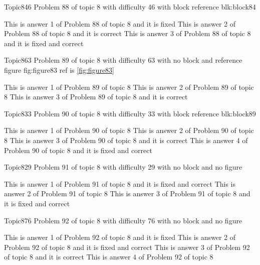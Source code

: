 \documentclass[master]{exam}
\begin{document}
\begin{problem}[requires=blk:block84]{Topic8}{46}
	Problem 88 of topic 8 with difficulty 46 with block reference blk:block84
	\begin{answers}
		\answer[fixed] This is answer 1 of Problem 88 of topic 8 and it is fixed
		\answer[correct] This is answer 2 of Problem 88 of topic 8 and it is correct
		 This is answer 3 of Problem 88 of topic 8 and it is fixed and correct
	\end{answers}
\end{problem}

\begin{problem}{Topic8}{63}
	Problem 89 of topic 8 with difficulty 63 with no block and reference figure fig:figure83 ref is \ref{fig:figure83}
	\begin{answers}
		\answer This is answer 1 of Problem 89 of topic 8 
		\answer This is answer 2 of Problem 89 of topic 8 
		\answer[correct] This is answer 3 of Problem 89 of topic 8 and it is correct
	\end{answers}
\end{problem}

\begin{problem}[requires=blk:block89]{Topic8}{33}
	Problem 90 of topic 8 with difficulty 33 with block reference blk:block89
	\begin{answers}
		\answer This is answer 1 of Problem 90 of topic 8 
		\answer This is answer 2 of Problem 90 of topic 8 
		\answer[correct] This is answer 3 of Problem 90 of topic 8 and it is correct
		 This is answer 4 of Problem 90 of topic 8 and it is fixed and correct
	\end{answers}
\end{problem}

\begin{problem}{Topic8}{29}
	Problem 91 of topic 8 with difficulty 29 with no block and no figure
	\begin{answers}
		 This is answer 1 of Problem 91 of topic 8 and it is fixed and correct
		\answer This is answer 2 of Problem 91 of topic 8 
		 This is answer 3 of Problem 91 of topic 8 and it is fixed and correct
	\end{answers}
\end{problem}

\begin{problem}{Topic8}{76}
	Problem 92 of topic 8 with difficulty 76 with no block and no figure
	\begin{answers}
		\answer[fixed] This is answer 1 of Problem 92 of topic 8 and it is fixed
		 This is answer 2 of Problem 92 of topic 8 and it is fixed and correct
		\answer[correct] This is answer 3 of Problem 92 of topic 8 and it is correct
		\answer This is answer 4 of Problem 92 of topic 8 
	\end{answers}
\end{problem}
\end{document}
